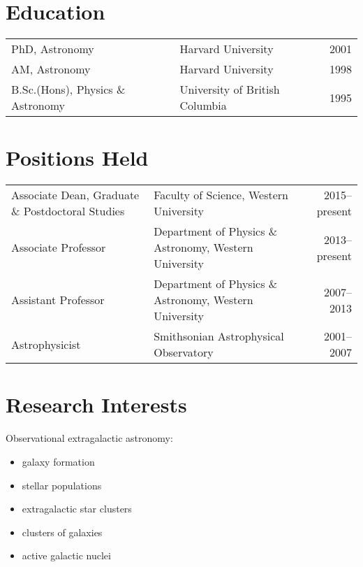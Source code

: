 \documentclass[12pt]{article}
\begin{document}
\maketitle

\section{Education}
\begin{tabularx}{\textwidth}{lXr}
PhD, Astronomy & Harvard University & 2001\\
AM, Astronomy & Harvard University & 1998\\
B.Sc.(Hons),  Physics \& Astronomy & University of British Columbia&1995\\
\end{tabularx}

\section{Positions Held} 

\begin{tabularx}{\textwidth}{p{5cm}Xr}
Associate Dean, Graduate \& Postdoctoral Studies & Faculty of Science, Western University & 2015--present \\
Associate Professor & Department of Physics \& Astronomy, Western University & 2013--present \\
Assistant Professor& Department of Physics \& Astronomy, Western University&2007--2013  \\
 Astrophysicist & Smithsonian Astrophysical Observatory & 2001--2007\\
\end{tabularx}


\section{Research Interests}

Observational extragalactic astronomy: 
\begin{itemize} 
\item galaxy formation
\item stellar populations
\item extragalactic star clusters
\item clusters of galaxies
\item active galactic nuclei
\end{itemize}
\end{document}

